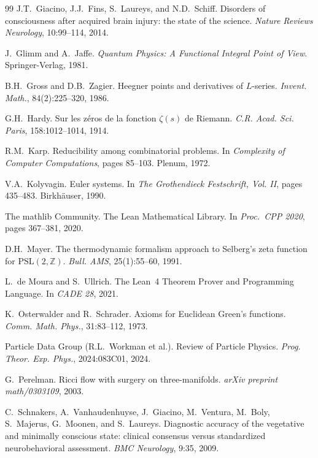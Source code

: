 \documentclass[11pt,a4paper]{amsart}
\theoremstyle{plain}
\theoremstyle{definition}
\begin{document}
\begin{thebibliography}{99}
J.T.~Giacino, J.J.~Fins, S.~Laureys, and N.D.~Schiff.
\newblock Disorders of consciousness after acquired brain injury: the state of the science.
\newblock \emph{Nature Reviews Neurology}, 10:99--114, 2014.

J.~Glimm and A.~Jaffe.
\newblock \emph{Quantum Physics: A Functional Integral Point of View}.
\newblock Springer-Verlag, 1981.

B.H.~Gross and D.B.~Zagier.
\newblock Heegner points and derivatives of $L$-series.
\newblock \emph{Invent. Math.}, 84(2):225--320, 1986.

G.H.~Hardy.
\newblock Sur les z\'eros de la fonction $\zeta(s)$ de Riemann.
\newblock \emph{C.R. Acad. Sci. Paris}, 158:1012--1014, 1914.

R.M.~Karp.
\newblock Reducibility among combinatorial problems.
\newblock In \emph{Complexity of Computer Computations}, pages 85--103. Plenum, 1972.

V.A.~Kolyvagin.
\newblock Euler systems.
\newblock In \emph{The Grothendieck Festschrift, Vol. II}, pages 435--483. Birkh\"auser, 1990.

The mathlib Community.
\newblock The Lean Mathematical Library.
\newblock In \emph{Proc.\ CPP 2020}, pages 367--381, 2020.

D.H.~Mayer.
\newblock The thermodynamic formalism approach to Selberg's zeta function for $\mathrm{PSL}(2,\mathbb{Z})$.
\newblock \emph{Bull. AMS}, 25(1):55--60, 1991.

L.~de Moura and S.~Ullrich.
\newblock The Lean~4 Theorem Prover and Programming Language.
\newblock In \emph{CADE 28}, 2021.

K.~Osterwalder and R.~Schrader.
\newblock Axioms for Euclidean Green's functions.
\newblock \emph{Comm. Math. Phys.}, 31:83--112, 1973.

Particle Data Group (R.L.~Workman et al.).
\newblock Review of Particle Physics.
\newblock \emph{Prog. Theor. Exp. Phys.}, 2024:083C01, 2024.

G.~Perelman.
\newblock Ricci flow with surgery on three-manifolds.
\newblock \emph{arXiv preprint math/0303109}, 2003.

C.~Schnakers, A.~Vanhaudenhuyse, J.~Giacino, M.~Ventura, M.~Boly, S.~Majerus, G.~Moonen, and S.~Laureys.
\newblock Diagnostic accuracy of the vegetative and minimally conscious state: clinical consensus versus standardized neurobehavioral assessment.
\newblock \emph{BMC Neurology}, 9:35, 2009.


\end{thebibliography}
\end{document}

